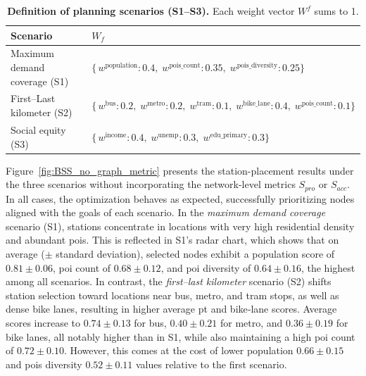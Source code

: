     \begin{table}[!htpb]
        \caption[Definition of planning scenarios (S1–S3)]{
            \textbf{Definition of planning scenarios (S1–S3).} 
            Each weight vector $W^f$ sums to 1.
        }
        \label{tab:scenario-defs}
        \footnotesize
        \centering
        \begin{tabular}{p{0.32\linewidth} p{0.68\linewidth}}
        \toprule
        \textbf{Scenario}  &  \textbf{$W_f$}\\
        \midrule
        Maximum demand coverage (S1)& \(\{\,w^{\mathrm{population}}:0.4,\;w^{\mathrm{pois\_count}}:0.35,\;w^{\mathrm{pois\_diversity}}:0.25\}\)\\
            First–Last kilometer (S2)& \(\{\,w^{\mathrm{bus}}:0.2,\;w^{\mathrm{metro}}:0.2,\;w^{\mathrm{tram}}:0.1,\;w^{\mathrm{bike\_lane}}:0.4,\;w^{\mathrm{pois\_count}}:0.1\}\)\\
            Social equity (S3)& \(\{\,w^{\mathrm{income}}:0.4,\;w^{\mathrm{unemp}}:0.3,\;w^{\mathrm{edu\_primary}}:0.3\}\)\\
        \bottomrule
        \end{tabular}
    \end{table}

    Figure~\ref{fig:BSS_no_graph_metric} presents the station-placement results under the three scenarios without incorporating the network-level metrics $S_{pro}$ or $S_{acc}$. In all cases, the optimization behaves as expected, successfully prioritizing nodes aligned with the goals of each scenario. In the \textit{maximum demand coverage} scenario (S1), stations concentrate in locations with very high residential density and abundant \acp{poi}. This is reflected in S1's radar chart, which shows that on average ($\pm$ standard deviation), selected nodes exhibit a population score of $0.81 \pm 0.06$, \ac{poi} count of $0.68 \pm 0.12$, and \ac{poi} diversity of $0.64 \pm 0.16$, the highest among all scenarios. In contrast, the \textit{first–last kilometer} scenario (S2) shifts station selection toward locations near bus, metro, and tram stops, as well as dense bike lanes, resulting in higher average \ac{pt} and bike‐lane scores. Average scores increase to $0.74 \pm 0.13$ for bus, $0.40 \pm 0.21$ for metro, and $0.36 \pm 0.19$ for bike lanes, all notably higher than in S1, while also maintaining a high \ac{poi} count of $0.72 \pm 0.10$. However, this comes at the cost of lower population $0.66 \pm 0.15$ and \acp{poi} diversity $0.52 \pm 0.11$ values relative to the first scenario. 

